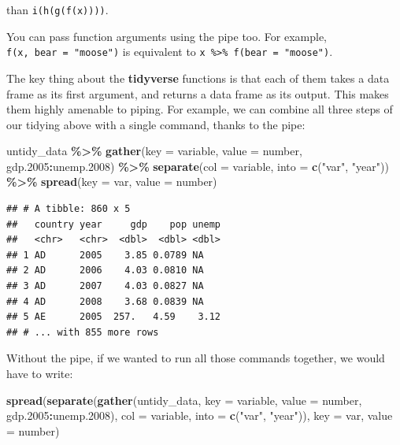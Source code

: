 \documentclass[
  12pt,
  oneside,openany]{book}
\newenvironment{Shaded}{\begin{snugshade}}{\end{snugshade}}
\newcommand{\DataTypeTok}[1]{\textcolor[rgb]{0.13,0.29,0.53}{#1}}
\newcommand{\FloatTok}[1]{\textcolor[rgb]{0.00,0.00,0.81}{#1}}
\newcommand{\KeywordTok}[1]{\textcolor[rgb]{0.13,0.29,0.53}{\textbf{#1}}}
\newcommand{\NormalTok}[1]{#1}
\newcommand{\OperatorTok}[1]{\textcolor[rgb]{0.81,0.36,0.00}{\textbf{#1}}}
\newcommand{\StringTok}[1]{\textcolor[rgb]{0.31,0.60,0.02}{#1}}
\begin{document}
than \texttt{i(h(g(f(x))))}.

You can pass function arguments using the pipe too. For example, \texttt{f(x,\ bear\ =\ "moose")} is equivalent to \texttt{x\ \%\textgreater{}\%\ f(bear\ =\ "moose")}.

The key thing about the \textbf{tidyverse} functions is that each of them takes a data frame as its first argument, and returns a data frame as its output. This makes them highly amenable to piping. For example, we can combine all three steps of our tidying above with a single command, thanks to the pipe:

\begin{Shaded}
\begin{Highlighting}[]
\NormalTok{untidy\_data }\OperatorTok{\%\textgreater{}\%}
\StringTok{  }\KeywordTok{gather}\NormalTok{(}\DataTypeTok{key =}\NormalTok{ variable,}
         \DataTypeTok{value =}\NormalTok{ number,}
\NormalTok{         gdp}\FloatTok{.2005}\OperatorTok{:}\NormalTok{unemp}\FloatTok{.2008}\NormalTok{) }\OperatorTok{\%\textgreater{}\%}
\StringTok{  }\KeywordTok{separate}\NormalTok{(}\DataTypeTok{col =}\NormalTok{ variable,}
           \DataTypeTok{into =} \KeywordTok{c}\NormalTok{(}\StringTok{"var"}\NormalTok{, }\StringTok{"year"}\NormalTok{)) }\OperatorTok{\%\textgreater{}\%}
\StringTok{  }\KeywordTok{spread}\NormalTok{(}\DataTypeTok{key =}\NormalTok{ var,}
         \DataTypeTok{value =}\NormalTok{ number)}
\end{Highlighting}
\end{Shaded}

\begin{verbatim}
## # A tibble: 860 x 5
##   country year     gdp    pop unemp
##   <chr>   <chr>  <dbl>  <dbl> <dbl>
## 1 AD      2005    3.85 0.0789 NA   
## 2 AD      2006    4.03 0.0810 NA   
## 3 AD      2007    4.03 0.0827 NA   
## 4 AD      2008    3.68 0.0839 NA   
## 5 AE      2005  257.   4.59    3.12
## # ... with 855 more rows
\end{verbatim}

Without the pipe, if we wanted to run all those commands together, we would have to write:

\begin{Shaded}
\begin{Highlighting}[]
\KeywordTok{spread}\NormalTok{(}\KeywordTok{separate}\NormalTok{(}\KeywordTok{gather}\NormalTok{(untidy\_data,}
                       \DataTypeTok{key =}\NormalTok{ variable,}
                       \DataTypeTok{value =}\NormalTok{ number,}
\NormalTok{                       gdp}\FloatTok{.2005}\OperatorTok{:}\NormalTok{unemp}\FloatTok{.2008}\NormalTok{),}
                \DataTypeTok{col =}\NormalTok{ variable,}
                \DataTypeTok{into =} \KeywordTok{c}\NormalTok{(}\StringTok{"var"}\NormalTok{, }\StringTok{"year"}\NormalTok{)),}
       \DataTypeTok{key =}\NormalTok{ var,}
       \DataTypeTok{value =}\NormalTok{ number)}
\end{Highlighting}
\end{Shaded}
\end{document}
